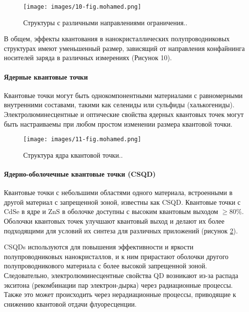 \documentclass[a4paper,14pt]{extarticle}
\begin{document}
\begin{figure}[htbp]
    \centering
    \texttt{[image: images/10-fig.mohamed.png]}
    \caption{\label{fig:mohamed8} Структуры с различными направлениями ограничения.\cite{mohamed}.}
\end{figure}

В общем, эффекты квантования в нанокристаллических полупроводниковых структурах имеют уменьшенный размер, зависящий от направления конфайнинга носителей заряда в различных измерениях (Рисунок 10).

\paragraph{Ядерные квантовые точки}

Квантовые точки могут быть однокомпонентными материалами с равномерными внутренними составами, такими как селениды или сульфиды (халькогениды). Электролюминесцентные и оптические свойства ядерных квантовых точек могут быть настраиваемы при любом простом изменении размера квантовой точки.

\begin{figure}[htbp]
    \centering
    \texttt{[image: images/11-fig.mohamed.png]}
    \caption{\label{fig:mohamed9} Структура ядра квантовой точки.\cite{mohamed}.}
\end{figure}

\paragraph{Ядерно-оболочечные квантовые точки (CSQD)}

Квантовые точки с небольшими областями одного материала, встроенными в другой материал с запрещенной зоной, известны как CSQD. Квантовые точки с \( \text{CdSe} \) в ядре и \( \text{ZnS} \) в оболочке доступны с высоким квантовым выходом \(\geq 80\%\). Оболочки квантовых точек улучшают квантовый выход и делают их более подходящими для условий их синтеза для различных приложений (рисунок \ref{fig:mohamed9}).

CSQDs используются для повышения эффективности и яркости полупроводниковых нанокристаллов, и к ним прирастают оболочки другого полупроводникового материала с более высокой запрещенной зоной. Следовательно, электролюминесцентные свойства QD возникают из-за распада экситона (рекомбинации пар электрон-дырка) через радиационные процессы. Также это может происходить через нерадиационные процессы, приводящие к снижению квантовой отдачи флуоресценции.
\end{document}
